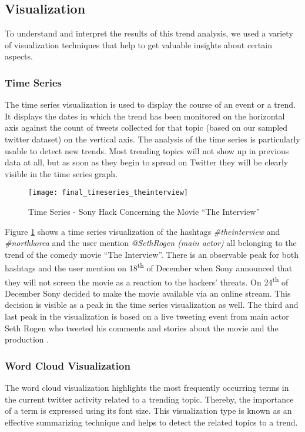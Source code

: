 \subsection{Visualization}
\label{subsec:visualization}
To understand and interpret the results of this trend analysis, we used a variety of visualization techniques that help to get valuable insights about certain aspects.

\subsubsection{Time Series}
\label{subsubsec:vis-time-series}
The time series visualization is used to display the course of an event or a trend. It displays the dates in which the trend has been monitored on the horizontal axis against the count of tweets collected for that topic (based on our sampled twitter dataset) on the vertical axis. The analysis of the time series is particularly usable to detect new trends. Most trending topics will not show up in previous data at all, but as soon as they begin to spread on Twitter they will be clearly visible in the time series graph.

\begin{figure}[H]
  \centering
        \texttt{[image: final\_timeseries\_theinterview]}
  \caption[Time Series - Sony Hack Concerning the Movie \enquote{The Interview}]{Time Series - Sony Hack Concerning the Movie \enquote{The Interview}}
  \label{fig:time-series-interview}
  \vspace{-1.3em}
\end{figure}

Figure \ref{fig:time-series-interview} shows a time series visualization of the hashtags \textit{\#theinterview} and \textit{\#northkorea} and the user mention \textit{@SethRogen (main actor)} all belonging to the trend of the comedy movie \enquote{The Interview}. There is an observable peak for both hashtags and the user mention on 18\textsuperscript{th} of December when Sony announced that they will not screen the movie as a reaction to the hackers' threats. On 24\textsuperscript{th} of December Sony decided to make the movie available via an online stream. This decision is visible as a peak in the time series visualization as well. The third and last peak in the visualization is based on a live tweeting event from main actor Seth Rogen who tweeted his comments and stories about the movie and the production \cite{deadline2014interview}.

\subsubsection{Word Cloud Visualization}
\label{subsubsec:vis-word-clouds}
The word cloud visualization highlights the most frequently occurring terms in the current twitter activity related to a trending topic. Thereby, the importance of a term is expressed using its font size. This visualization type is known as an effective summarizing technique and helps to detect the related topics to a trend.

